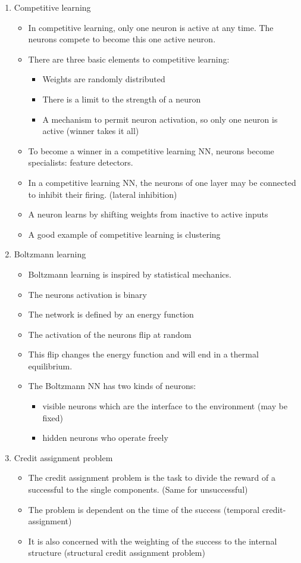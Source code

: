 \documentclass{scrartcl}
\begin{document}
\begin{enumerate}
\item Competitive learning
	\begin{itemize}
	\item In competitive learning, only one neuron is active at any time. The neurons compete to become this one active neuron.
	\item There are three basic elements to competitive learning:
		\begin{itemize}
		\item Weights are randomly distributed
		\item There is a limit to the strength of a neuron
		\item A mechanism to permit neuron activation, so only one neuron is active (winner takes it all)
		\end{itemize}
	\item To become a winner in a competitive learning NN, neurons become specialists: feature detectors.
	\item In a competitive learning NN, the neurons of one layer may be connected to inhibit their firing. (lateral inhibition)
	\item A neuron learns by shifting weights from inactive to active inputs
	\item A good example of competitive learning is clustering
	\end{itemize}
	
\item Boltzmann learning
	\begin{itemize}
	\item Boltzmann learning is inspired by statistical mechanics.
	\item The neurons activation is binary
	\item The network is defined by an energy function
	\item The activation of the neurons flip at random
	\item This flip changes the energy function and will end in a thermal equilibrium.
	\item The Boltzmann NN has two kinds of neurons:
		\begin{itemize}
		\item visible neurons which are the interface to the environment (may be fixed)
		\item hidden neurons who operate freely
		\end{itemize}
	\end{itemize}
	
\item Credit assignment problem
	\begin{itemize}
	\item The credit assignment problem is the task to divide the reward of a successful to the single components. (Same for unsuccessful)
	\item The problem is dependent on the time of the success (temporal credit-assignment)
	\item It is also concerned with the weighting of the success to the internal structure (structural credit assignment problem)
	\end{itemize}
	

\end{enumerate}
\end{document}
